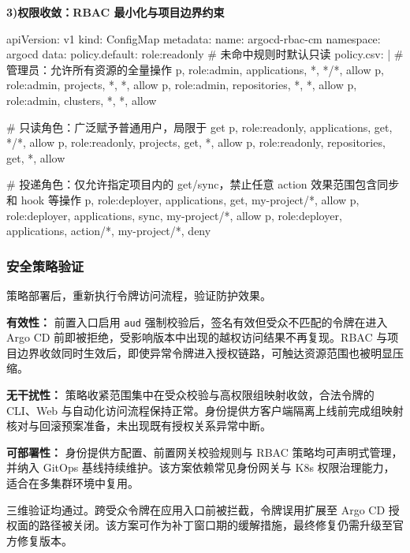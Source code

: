 
\textbf{3)权限收敛：RBAC 最小化与项目边界约束}
\begin{AppendixCode}
apiVersion: v1
kind: ConfigMap
metadata:
  name: argocd-rbac-cm
  namespace: argocd
data:
  policy.default: role:readonly  # 未命中规则时默认只读
  policy.csv: |
    # 管理员：允许所有资源的全量操作
    p, role:admin, applications, *, */*, allow
    p, role:admin, projects, *, *, allow
    p, role:admin, repositories, *, *, allow
    p, role:admin, clusters, *, *, allow

    # 只读角色：广泛赋予普通用户，局限于 get
    p, role:readonly, applications, get, */*, allow
    p, role:readonly, projects, get, *, allow
    p, role:readonly, repositories, get, *, allow

    # 投递角色：仅允许指定项目内的 get/sync，禁止任意 action 效果范围包含同步和 hook 等操作
    p, role:deployer, applications, get, my-project/*, allow
    p, role:deployer, applications, sync, my-project/*, allow
    p, role:deployer, applications, action/*, my-project/*, deny
\end{AppendixCode}


\subsubsection{安全策略验证}

策略部署后，重新执行令牌访问流程，验证防护效果。

\textbf{有效性：}
前置入口启用 \texttt{aud} 强制校验后，签名有效但受众不匹配的令牌在进入 Argo CD 前即被拒绝，受影响版本中出现的越权访问结果不再复现。RBAC 与项目边界收敛同时生效后，即使异常令牌进入授权链路，可触达资源范围也被明显压缩。

\textbf{无干扰性：}
策略收紧范围集中在受众校验与高权限组映射收敛，合法令牌的 CLI、Web 与自动化访问流程保持正常。身份提供方客户端隔离上线前完成组映射核对与回滚预案准备，未出现既有授权关系异常中断。

\textbf{可部署性：}
身份提供方配置、前置网关校验规则与 RBAC 策略均可声明式管理，并纳入 GitOps 基线持续维护。该方案依赖常见身份网关与 K8s 权限治理能力，适合在多集群环境中复用。

三维验证均通过。跨受众令牌在应用入口前被拦截，令牌误用扩展至 Argo CD 授权面的路径被关闭。该方案可作为补丁窗口期的缓解措施，最终修复仍需升级至官方修复版本。


